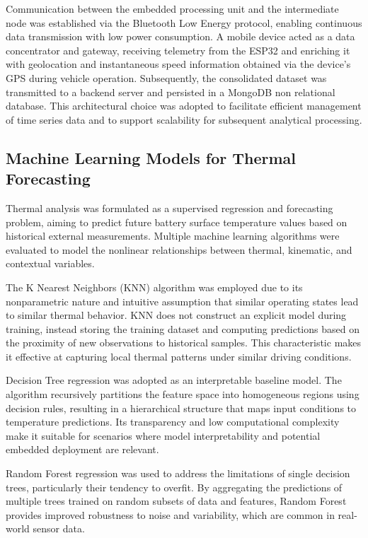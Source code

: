 \documentclass[conference]{IEEEtran}
\begin{document}
Communication between the embedded processing unit and the intermediate node was established via the Bluetooth Low Energy protocol, enabling continuous data transmission with low power consumption. A mobile device acted as a data concentrator and gateway, receiving telemetry from the ESP32 and enriching it with geolocation and instantaneous speed information obtained via the device’s GPS during vehicle operation. Subsequently, the consolidated dataset was transmitted to a backend server and persisted in a MongoDB non relational database. This architectural choice was adopted to facilitate efficient management of time series data and to support scalability for subsequent analytical processing.

\subsection{Machine Learning Models for Thermal Forecasting}

Thermal analysis was formulated as a supervised regression and forecasting problem, aiming to predict future battery surface temperature values based on historical external measurements. Multiple machine learning algorithms were evaluated to model the nonlinear relationships between thermal, kinematic, and contextual variables.

The K Nearest Neighbors (KNN) algorithm was employed due to its nonparametric nature and intuitive assumption that similar operating states lead to similar thermal behavior. KNN does not construct an explicit model during training, instead storing the training dataset and computing predictions based on the proximity of new observations to historical samples. This characteristic makes it effective at capturing local thermal patterns under similar driving conditions.

Decision Tree regression was adopted as an interpretable baseline model. The algorithm recursively partitions the feature space into homogeneous regions using decision rules, resulting in a hierarchical structure that maps input conditions to temperature predictions. Its transparency and low computational complexity make it suitable for scenarios where model interpretability and potential embedded deployment are relevant.

Random Forest regression was used to address the limitations of single decision trees, particularly their tendency to overfit. By aggregating the predictions of multiple trees trained on random subsets of data and features, Random Forest provides improved robustness to noise and variability, which are common in real-world sensor data.
\end{document}
